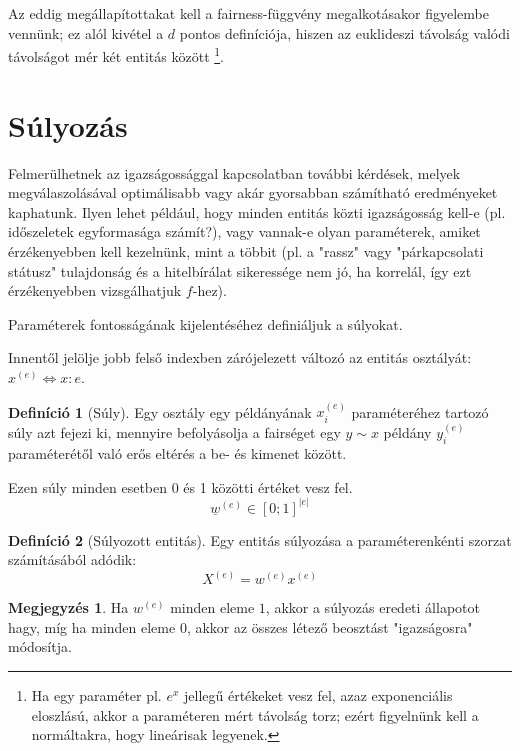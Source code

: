 \documentclass{article}
\theoremstyle{definition}
\newtheorem{definition}{Definíció}[section]
\newtheorem*{megj}{Megjegyzés}
\newcommand{\vect}[1]{ \underline{#1} }
\newcommand{\ent}[2]{ {#1}^{(#2)} }
\begin{document}
\begin{multicols}{2}
    Az eddig megállapítottakat kell a fairness-függvény megalkotásakor figyelembe vennünk; ez alól kivétel a $d$ pontos definíciója, hiszen az euklideszi távolság valódi távolságot mér két entitás között \footnote{Ha egy paraméter pl. $e^x$ jellegű értékeket vesz fel, azaz exponenciális eloszlású, akkor a paraméteren mért távolság torz; ezért figyelnünk kell a normáltakra, hogy lineárisak legyenek.}.
    

\section{Súlyozás}
    Felmerülhetnek az igazságossággal kapcsolatban további kérdések, melyek megválaszolásával optimálisabb vagy akár gyorsabban számítható eredményeket kaphatunk. Ilyen lehet például, hogy minden entitás közti igazságosság kell-e (pl. időszeletek egyformasága számít?), vagy vannak-e olyan paraméterek, amiket érzékenyebben kell kezelnünk, mint a többit (pl. a "rassz" vagy "párkapcsolati státusz" tulajdonság és a hitelbírálat sikeressége nem jó, ha korrelál, így ezt érzékenyebben vizsgálhatjuk $f$-hez).
    
    Paraméterek fontosságának kijelentéséhez definiáljuk a súlyokat.
    
    Innentől jelölje jobb felső indexben zárójelezett változó az entitás osztályát: $x^{(e)} \Leftrightarrow x:e$.
    
    \begin{definition}[Súly]
        Egy osztály egy példányának $\ent{x}{e}_i$ paraméteréhez tartozó súly azt fejezi ki, mennyire befolyásolja a fairséget egy $y\sim x$ példány $\ent{y}{e}_i$ paraméterétől való erős eltérés a be- és kimenet között. 
        
        Ezen súly minden esetben 0 és 1 közötti értéket vesz fel.
        \begin{equation}
            \ent{\vect w}{e} \in [0;1]^{|e|}
        \end{equation}
    \end{definition}
    
    \begin{definition}[Súlyozott entitás]
        Egy entitás súlyozása a paraméterenkénti szorzat számításából adódik:
        \begin{equation}
            \ent X e = \ent w e \ent x e
        \end{equation}
    \end{definition}
    
    \begin{megj}
        Ha $\ent w e$ minden eleme $1$, akkor a súlyozás eredeti állapotot hagy, míg ha minden eleme $0$, akkor az összes létező beosztást "igazságosra" módosítja.
    \end{megj}
    

\end{multicols}
\end{document}
